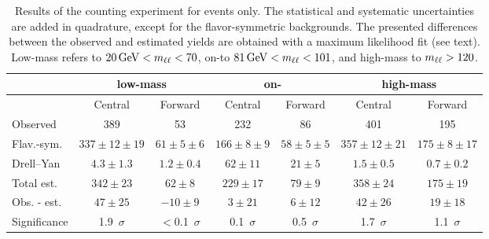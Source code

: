 
\begin{table}[btp]
 \renewcommand{\arraystretch}{1.3}
 \setlength{\belowcaptionskip}{6pt}
 \scriptsize
 \centering
 \caption{Results of the counting experiment for \EE events only.
     The statistical and systematic uncertainties are added in quadrature, except for the flavor-symmetric backgrounds. The presented differences between the observed and estimated yields are obtained with a maximum likelihood fit (see text).    Low-mass refers to $20\,\mathrm{Ge\hspace{-.08em}V} < m_{\ell\ell} < 70$\GeV, on-\Z to  $81\,\mathrm{Ge\hspace{-.08em}V} < m_{\ell\ell} < 101$\GeV, and high-mass to $m_{\ell\ell} > 120$\GeV.
     }
  \label{tab:METresults2012EE}
  \begin{tabular}{l| cc | cc | cc}

    							& \multicolumn{2}{c}{low-mass} & \multicolumn{2}{c}{on-\Z} & \multicolumn{2}{c}{high-mass} \\ 

    \hline
                                &  Central        & Forward  &  Central  & Forward   &  Central        & Forward \\ 

    \hline
        Observed       &  389                   & 53              &  232            &  86       &   401           &   195    \\

    \hline
        Flav.-sym.    & $337\pm12\pm19$        & $61\pm5\pm6$  &  $166\pm8\pm9$ & $58\pm5\pm5$ & $357\pm12\pm21$ & $175\pm8\pm17$ \\

            Drell--Yan          & $4.3\pm1.3$            & $1.2\pm0.4$      & $62\pm11$ & $21\pm5$ & $1.5\pm0.5$ & $0.7\pm0.2$ \\

    \hline
            Total est.          & $342\pm23$            & $62\pm8$      & $229\pm17$ & $79\pm9$ & $358\pm24$ & $175\pm19$ \\

    \hline
         Obs. - est.  & $47\pm25$      & $-10\pm9$ & $3\pm21 $ & $6\pm12$ & $42\pm26$ & $19\pm18 $ \\ 

    \hline
   Significance      & 1.9~$\sigma$    &  $<$0.1~$\sigma$  & 0.1~$\sigma$ & 0.5~$\sigma$ & 1.7~$\sigma$ & 1.1~$\sigma$ \\ 


  \end{tabular}
\end{table}


